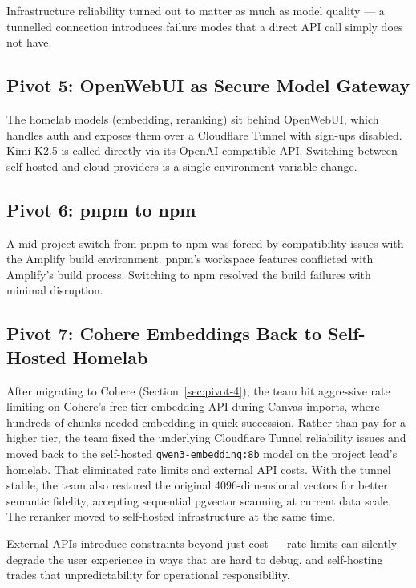 \documentclass[12pt,a4paper]{article}
\newcommand{\tech}[1]{\texttt{#1}}
\begin{document}
Infrastructure reliability turned out to matter as much as model quality --- a tunnelled connection introduces failure modes that a direct API call simply does not have.

\subsection{Pivot 5: OpenWebUI as Secure Model Gateway}
\label{sec:pivot-5}

The homelab models (embedding, reranking) sit behind OpenWebUI, which handles auth and exposes them over a Cloudflare Tunnel with sign-ups disabled. Kimi K2.5 is called directly via its OpenAI-compatible API. Switching between self-hosted and cloud providers is a single environment variable change.

\subsection{Pivot 6: pnpm to npm}
\label{sec:pivot-6}

A mid-project switch from pnpm to npm was forced by compatibility issues with the Amplify build environment. pnpm's workspace features conflicted with Amplify's build process. Switching to npm resolved the build failures with minimal disruption.

\subsection{Pivot 7: Cohere Embeddings Back to Self-Hosted Homelab}
\label{sec:pivot-7}

After migrating to Cohere (Section~\ref{sec:pivot-4}), the team hit aggressive rate limiting on Cohere's free-tier embedding API during Canvas imports, where hundreds of chunks needed embedding in quick succession. Rather than pay for a higher tier, the team fixed the underlying Cloudflare Tunnel reliability issues and moved back to the self-hosted \tech{qwen3-embedding:8b} model on the project lead's homelab. That eliminated rate limits and external API costs. With the tunnel stable, the team also restored the original 4096-dimensional vectors for better semantic fidelity, accepting sequential pgvector scanning at current data scale. The reranker moved to self-hosted infrastructure at the same time.

External APIs introduce constraints beyond just cost --- rate limits can silently degrade the user experience in ways that are hard to debug, and self-hosting trades that unpredictability for operational responsibility.
\end{document}
